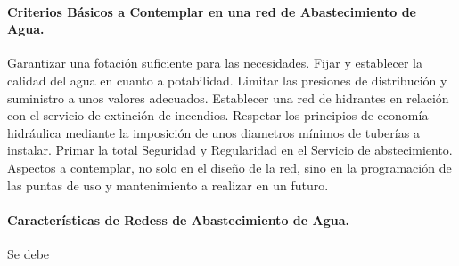 \paragraph{Criterios Básicos a Contemplar en una red de Abastecimiento de Agua.}
Garantizar una fotación suficiente para las necesidades. Fijar y establecer la calidad del agua en cuanto a potabilidad. Limitar las presiones de distribución y suministro a unos valores adecuados. Establecer una red de hidrantes en relación con el servicio de extinción de incendios. Respetar los principios de economía hidráulica mediante la imposición de unos diametros mínimos de tuberías a instalar. Primar la total Seguridad y Regularidad en el Servicio de abstecimiento. Aspectos a contemplar, no solo en el diseño de la red, sino en la programación de las puntas de uso y mantenimiento a realizar en un futuro.

\paragraph{Características de Redess de Abastecimiento de Agua.}
Se debe 
